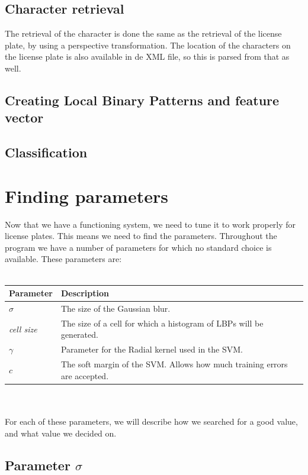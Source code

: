 \documentclass[a4paper]{article}
\begin{document}
\subsection{Character retrieval}

The retrieval of the character is done the same as the retrieval of the license
plate, by using a perspective transformation. The location of the characters on
the license plate is also available in de XML file, so this is parsed from that
as well.

\subsection{Creating Local Binary Patterns and feature vector}


\subsection{Classification}



\section{Finding parameters}

Now that we have a functioning system, we need to tune it to work properly for
license plates. This means we need to find the parameters. Throughout the 
program we have a number of parameters for which no standard choice is
available. These parameters are:\\
\\
\begin{tabular}{l|l}
	Parameter 			& Description\\
	\hline
	$\sigma$  			& The size of the Gaussian blur.\\
	\emph{cell size}	& The size of a cell for which a histogram of LBPs will
	                      be generated.\\
	$\gamma$			& Parameter for the Radial kernel used in the SVM.\\
	$c$					& The soft margin of the SVM. Allows how much training
						  errors are accepted.
\end{tabular}\\
\\
For each of these parameters, we will describe how we searched for a good
value, and what value we decided on.

\subsection{Parameter $\sigma$}
\end{document}
